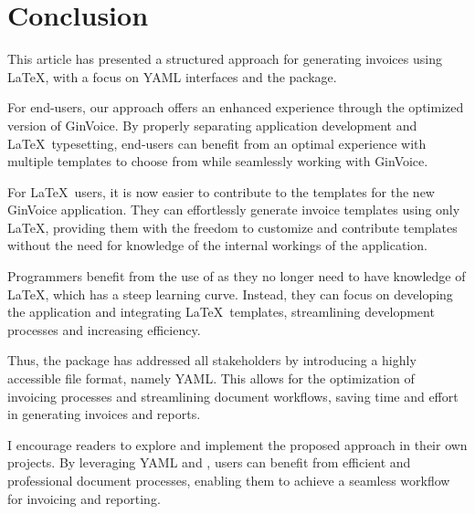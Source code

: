 \section{Conclusion}\label{sec:conclusie}
This article has presented a structured approach for generating invoices using \LaTeX, with a focus on YAML interfaces and the  package.

For end-users, our approach offers an enhanced experience through the optimized version of GinVoice.
By properly separating application development and \LaTeX\ typesetting, end-users can benefit from an optimal experience with multiple templates to choose from while seamlessly working with GinVoice.

For \LaTeX\ users, it is now easier to contribute to the templates for the new GinVoice application.
They can effortlessly generate invoice templates using only \LaTeX, providing them with the freedom to customize and contribute templates without the need for knowledge of the internal workings of the application.

Programmers benefit from the use of  as they no longer need to have knowledge of \LaTeX, which has a steep learning curve.
Instead, they can focus on developing the application and integrating \LaTeX\ templates, streamlining development processes and increasing efficiency.

Thus, the  package has addressed all stakeholders by introducing a highly accessible file format, namely YAML.
This allows for the optimization of invoicing processes and streamlining document workflows, saving time and effort in generating invoices and reports.

I encourage readers to explore and implement the proposed approach in their own projects.
By leveraging YAML and , users can benefit from efficient and professional document processes, enabling them to achieve a seamless workflow for invoicing and reporting.
